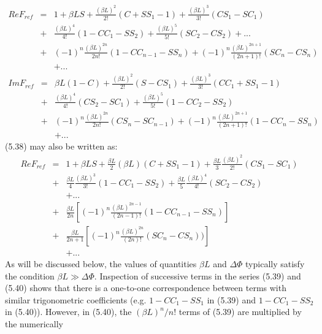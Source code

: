 {\begin{eqnarray}
     Re F_{ref} & = & 1+\beta L S +  \frac{(\beta L)^2}{2!}(C+SS_1-1) + \frac{(\beta L)^3}{3!}(C S_1-S C_1 )
      \nonumber \\
      & + &  \frac{(\beta L)^4}{4!}(1-CC_1-SS_2) + \frac{(\beta L)^5}{5!}(SC_2-CS_2 ) + ... \nonumber \\
     & + & (-1)^{n} \frac{(\beta L)^{2n}}{2n!}(1-CC_{n-1}-SS_{n}) +(-1)^{n} \frac{(\beta L)^{2n+1}}{(2n+1)!}
       (S C_{n}-CS_{n}) \nonumber \\
     &  & + ...
 \end{eqnarray}
  \newpage
   \begin{eqnarray}
        Im F_{ref} & = & \beta L (1-C)+  \frac{(\beta L)^2}{2!}(S-C S_1) + \frac{(\beta L)^3}{3!}(CC_1+SS_1-1)
      \nonumber \\
      & + &  \frac{(\beta L)^4}{4!}(C S_2-S C_1)
        + \frac{(\beta L)^5}{5!}(1-CC_2-SS_2) \nonumber \\
       & + &   (-1)^{n}\frac{(\beta L)^{2n}}{2n!}(CS_{n}-S C_{n-1}) +(-1)^{n} \frac{(\beta L)^{2n+1}}{(2n+1)!} 
       (1-CC_{n}-SS_{n})   \nonumber \\
      &   &  + ... 
     \end{eqnarray}
     (5.38) may also be written as:
    \begin{eqnarray}
     Re F_{ref} & = & 1+\beta L S +\frac{\beta L}{2}(\beta L)(C+SS_1-1)
       + \frac{\beta L}{3}\frac{(\beta L)^2}{2!}(C S_1-S C_1)
      \nonumber \\
      & + &  \frac{\beta L}{4} \frac{(\beta L)^3}{3!}(1-CC_1-SS_2)
       + \frac{\beta L}{5} \frac{(\beta L)^4}{4!}(S C_2- CS_2) \nonumber \\
       &   & +... \nonumber \\
       & + & \frac{\beta L}{2n}\left[(-1)^{n} \frac{(\beta L)^{2n-1}}{(2n-1)!} 
       (1-CC_{n-1}-SS_{n})\right] \nonumber \\
       & + & \frac{\beta L}{2n+1}\left[(-1)^{n} \frac{(\beta L)^{2n}}{(2n)!}
       (S C_{n}-CS_{n}))\right]\nonumber \\
       &   &  + ... 
     \end{eqnarray}  
     As will be discussed below, the values of quantities $\beta L$ and $\Delta \Phi$ typically 
     satisfy the condition $\beta L \gg \Delta \Phi$. Inspection of successive terms in the series
   (5.39) and (5.40) shows that there is a one-to-one correspondence between terms with
    similar trigonometric coefficients (e.g. $1-CC_1-SS_1$ in (5.39) and $1-CC_1-SS_2$ in
     (5.40)). However, in (5.40), the $(\beta L)^n/n!$ terms of (5.39) are multiplied by the numerically
}
